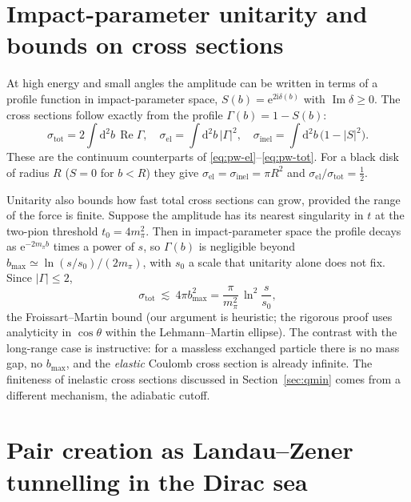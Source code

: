 \documentclass[11pt,a4paper]{book}
\numberwithin{equation}{chapter}
\newcommand{\dd}{\mathrm{d}}
\newcommand{\ii}{\mathrm{i}}
\newcommand{\ee}{\mathrm{e}}
\newcommand{\Imag}{\operatorname{Im}}
\newcommand{\Real}{\operatorname{Re}}
\begin{document}
\section{Impact-parameter unitarity and bounds on cross sections}

At high energy and small angles the amplitude can be written in terms of a profile
function in impact-parameter space, $S(b)=\ee^{2\ii\delta(b)}$ with
$\Imag\delta\ge0$. The cross sections follow exactly from the profile
$\Gamma(b)=1-S(b)$:
\begin{equation}\label{eq:b-unit}
  \sigma_{\mathrm{tot}}=2\!\int\!\dd^2b\,\Real\Gamma,\quad
  \sigma_{\mathrm{el}}=\!\int\!\dd^2b\,|\Gamma|^2,\quad
  \sigma_{\mathrm{inel}}=\!\int\!\dd^2b\,\bigl(1-|S|^2\bigr).
\end{equation}
These are the continuum counterparts of \eqref{eq:pw-el}--\eqref{eq:pw-tot}. For a
black disk of radius $R$ ($S=0$ for $b<R$) they give
$\sigma_{\mathrm{el}}=\sigma_{\mathrm{inel}}=\pi R^2$ and
$\sigma_{\mathrm{el}}/\sigma_{\mathrm{tot}}=\tfrac12$.

Unitarity also bounds how fast total cross sections can grow, provided the range
of the force is finite. Suppose the amplitude has its nearest singularity in $t$ at
the two-pion threshold $t_0=4m_\pi^2$. Then in impact-parameter space the
profile decays as $\ee^{-2m_\pi b}$ times a power of $s$, so $\Gamma(b)$ is
negligible beyond
$b_{\max}\simeq\ln(s/s_0)/(2m_\pi)$, with $s_0$ a scale that unitarity alone does
not fix. Since $|\Gamma|\le2$,
\begin{equation}\label{eq:froissart}
  \sigma_{\mathrm{tot}}\ \lesssim\ 4\pi b_{\max}^2=\frac{\pi}{m_\pi^2}\,\ln^2\frac{s}{s_0},
\end{equation}
the Froissart--Martin bound (our argument is heuristic; the rigorous proof uses
analyticity in $\cos\theta$ within the Lehmann--Martin ellipse). The contrast with
the long-range case is instructive: for a massless exchanged particle there is no
mass gap, no $b_{\max}$, and the \emph{elastic} Coulomb cross section is already
infinite. The finiteness of inelastic cross sections discussed in
Section~\ref{sec:qmin} comes from a different mechanism, the adiabatic cutoff.

\section{Pair creation as Landau--Zener tunnelling in the Dirac sea}\label{sec:schwinger}
\end{document}
